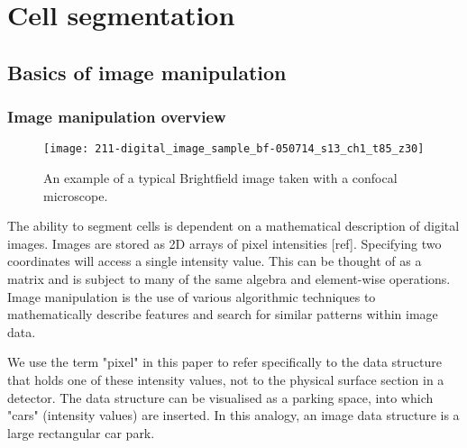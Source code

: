 
\chapter{Cell segmentation}

\ifpdf
    \graphicspath{{Chapter2/Figs/Raster/}{Chapter2/Figs/PDF/}{Chapter2/Figs/}}
\else
    \graphicspath{{Chapter2/Figs/Vector/}{Chapter2/Figs/}}
\fi

\section{Basics of image manipulation}

\subsection{Image manipulation overview}

\begin{figure}[htbp!]
\centering
\texttt{[image: 211-digital\_image\_sample\_bf-050714\_s13\_ch1\_t85\_z30]}
\caption[Brightfield image sample]{An example of a typical Brightfield image taken with a confocal microscope.}
\label{fig:digital_image_sample_bf}
\end{figure}

The ability to segment cells is dependent on a mathematical description of digital images. Images are stored as 2D arrays of pixel intensities [ref]. Specifying two coordinates will access a single intensity value. This can be thought of as a matrix and is subject to many of the same algebra and element-wise operations. Image manipulation is the use of various algorithmic techniques to mathematically describe features and search for similar patterns within image data. 

We use the term "pixel" in this paper to refer specifically to the data structure that holds one of these intensity values, not to the physical surface section in a detector. The data structure can be visualised as a parking space, into which "cars" (intensity values) are inserted. In this analogy, an image data structure is a large rectangular car park.

